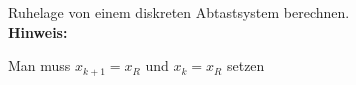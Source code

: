 \begin{question}[section=6,name={Ruhelage},difficulty=3,type=mdl,tags={20170203}]
	Ruhelage von einem diskreten Abtastsystem berechnen.
	\\ \textbf{Hinweis:}\\
	
\end{question}
\begin{solution}
	Man muss $x_{k+1} = x_R$ und $x_k = x_R$ setzen
\end{solution}